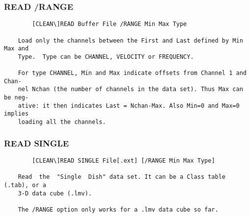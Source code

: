 \subsubsection{READ /RANGE}
\begin{verbatim}
        [CLEAN\]READ Buffer File /RANGE Min Max Type

    Load only the channels between the First and Last defined by Min Max and
    Type.  Type can be CHANNEL, VELOCITY or FREQUENCY.

    For type CHANNEL, Min and Max indicate offsets from Channel 1 and  Chan-
    nel Nchan (the number of channels in the data set). Thus Max can be neg-
    ative: it then indicates Last = Nchan-Max. Also Min=0 and Max=0  implies
    loading all the channels.

\end{verbatim}
\subsubsection{READ SINGLE}
\begin{verbatim}
        [CLEAN\]READ SINGLE File[.ext] [/RANGE Min Max Type]

    Read  the  "Single  Dish" data set. It can be a Class table (.tab), or a
    3-D data cube (.lmv).

    The /RANGE option only works for a .lmv data cube so far.

\end{verbatim}
